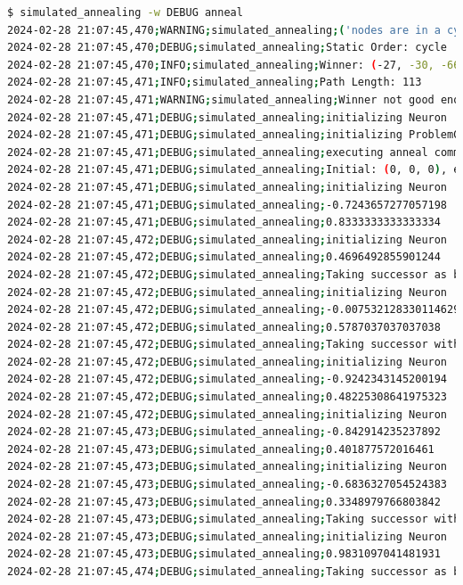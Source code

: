 \documentclass{article}
\begin{document}
\begin{lstlisting}[language=bash, caption=Example Output of Program]
$ simulated_annealing -w DEBUG anneal
2024-02-28 21:07:45,470;WARNING;simulated_annealing;('nodes are in a cycle', [(-23, -30, -67), err=1.000, (-21, -32, -65), err=1.000, (-23, -30, -67), err=1.000])
2024-02-28 21:07:45,470;DEBUG;simulated_annealing;Static Order: cycle
2024-02-28 21:07:45,470;INFO;simulated_annealing;Winner: (-27, -30, -66), err=1.000
2024-02-28 21:07:45,471;INFO;simulated_annealing;Path Length: 113
2024-02-28 21:07:45,471;WARNING;simulated_annealing;Winner not good enough, restarting with attempt #3.
2024-02-28 21:07:45,471;DEBUG;simulated_annealing;initializing Neuron
2024-02-28 21:07:45,471;DEBUG;simulated_annealing;initializing ProblemGraph
2024-02-28 21:07:45,471;DEBUG;simulated_annealing;executing anneal command
2024-02-28 21:07:45,471;DEBUG;simulated_annealing;Initial: (0, 0, 0), err=2.000
2024-02-28 21:07:45,471;DEBUG;simulated_annealing;initializing Neuron
2024-02-28 21:07:45,471;DEBUG;simulated_annealing;-0.7243657277057198
2024-02-28 21:07:45,471;DEBUG;simulated_annealing;0.8333333333333334
2024-02-28 21:07:45,472;DEBUG;simulated_annealing;initializing Neuron
2024-02-28 21:07:45,472;DEBUG;simulated_annealing;0.4696492855901244
2024-02-28 21:07:45,472;DEBUG;simulated_annealing;Taking successor as better option (exploitation)
2024-02-28 21:07:45,472;DEBUG;simulated_annealing;initializing Neuron
2024-02-28 21:07:45,472;DEBUG;simulated_annealing;-0.007532128330114629
2024-02-28 21:07:45,472;DEBUG;simulated_annealing;0.5787037037037038
2024-02-28 21:07:45,472;DEBUG;simulated_annealing;Taking successor with probability 98% (exploration)
2024-02-28 21:07:45,472;DEBUG;simulated_annealing;initializing Neuron
2024-02-28 21:07:45,472;DEBUG;simulated_annealing;-0.9242343145200194
2024-02-28 21:07:45,472;DEBUG;simulated_annealing;0.48225308641975323
2024-02-28 21:07:45,472;DEBUG;simulated_annealing;initializing Neuron
2024-02-28 21:07:45,473;DEBUG;simulated_annealing;-0.842914235237892
2024-02-28 21:07:45,473;DEBUG;simulated_annealing;0.401877572016461
2024-02-28 21:07:45,473;DEBUG;simulated_annealing;initializing Neuron
2024-02-28 21:07:45,473;DEBUG;simulated_annealing;-0.6836327054524383
2024-02-28 21:07:45,473;DEBUG;simulated_annealing;0.3348979766803842
2024-02-28 21:07:45,473;DEBUG;simulated_annealing;Taking successor with probability 12% (exploration)
2024-02-28 21:07:45,473;DEBUG;simulated_annealing;initializing Neuron
2024-02-28 21:07:45,473;DEBUG;simulated_annealing;0.9831097041481931
2024-02-28 21:07:45,474;DEBUG;simulated_annealing;Taking successor as better option (exploitation)

\end{lstlisting}
\end{document}
